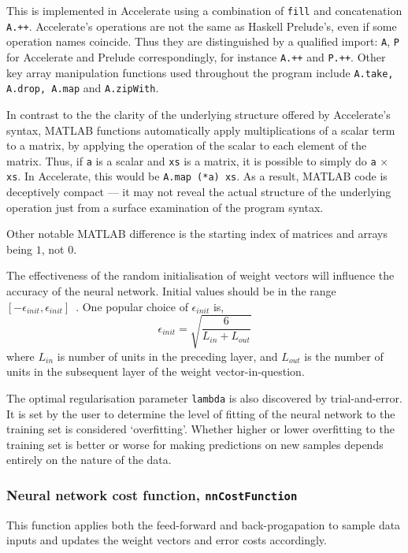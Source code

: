 This is implemented in Accelerate using a combination of \texttt{fill} and concatenation \texttt{A.++}. Accelerate's operations are not the same as Haskell Prelude's, even if some operation names coincide. Thus they are distinguished by a qualified import: \texttt{A}, \texttt{P} for Accelerate and Prelude correspondingly, for instance \texttt{A.++} and \texttt{P.++}. Other key array manipulation functions used throughout the program include \texttt{A.take, A.drop, A.map} and \texttt{A.zipWith}.

In contrast to the the clarity of the underlying structure offered by Accelerate's syntax, MATLAB functions automatically apply multiplications of a scalar term to a matrix, by applying the operation of the scalar to each element of the matrix. Thus, if \texttt{a} is a scalar and \texttt{xs} is a matrix, it is possible to simply do \texttt{a} $\times$ \texttt{xs}. In Accelerate, this would be \texttt{A.map (*a) xs}. As a result, MATLAB code is deceptively compact --- it may not reveal the actual structure of the underlying operation just from a surface examination of the program syntax. 

Other notable MATLAB difference is the starting index of matrices and arrays being $1$, not $0$.

The effectiveness of the random initialisation of weight vectors will influence the accuracy of the neural network. Initial values should be in the range $[-\epsilon_{init}, \epsilon_{init}]$~\cite{Ng12}. One popular choice of $\epsilon_{init}$ is,
\[ \epsilon_{init} = \sqrt{\frac{6}{L_{in} + L_{out}}} \]
where $L_{in}$ is number of units in the preceding layer, and $L_{out}$ is the number of units in the subsequent layer of the weight vector-in-question. 

The optimal regularisation parameter \texttt{lambda} is also discovered by trial-and-error. It is set by the user to determine the level of fitting of the neural network to the training set is considered `overfitting'. Whether higher or lower overfitting to the training set is better or worse for making predictions on new samples depends entirely on the nature of the data. 

\subsubsection{Neural network cost function, \texttt{nnCostFunction}} \label{se:impl.nnCostFunction}

This function applies both the feed-forward and back-progapation to sample data inputs and updates the weight vectors and error costs accordingly. 

